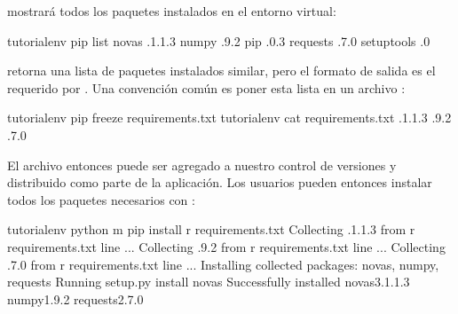 \documentclass[a4,10pt,spanish]{sphinxmanual}
\begin{document}
\sphinxAtStartPar
{} mostrará todos los paquetes instalados en el entorno virtual:

\begin{sphinxVerbatim}[commandchars=\\\{\}]
tutorial\PYGZhy{}env \PYGZdl{} pip list
novas .1.1.3
numpy .9.2
pip .0.3
requests .7.0
setuptools .0
\end{sphinxVerbatim}

\sphinxAtStartPar
{} retorna una lista de paquetes instalados similar, pero el formato de salida es el requerido por .  Una convención común es poner esta lista en un archivo :

\begin{sphinxVerbatim}[commandchars=\\\{\}]
tutorial\PYGZhy{}env \PYGZdl{} pip freeze \PYGZgt{} requirements.txt
tutorial\PYGZhy{}env \PYGZdl{} cat requirements.txt
.1.1.3
.9.2
.7.0
\end{sphinxVerbatim}

\sphinxAtStartPar
El archivo  entonces puede ser agregado a nuestro control de versiones y distribuido como parte de la aplicación. Los usuarios pueden entonces instalar todos los paquetes necesarios con :

\begin{sphinxVerbatim}[commandchars=\\\{\}]
tutorial\PYGZhy{}env \PYGZdl{} python \PYGZhy{}m pip install \PYGZhy{}r requirements.txt
Collecting .1.1.3 from \PYGZhy{}r requirements.txt line 
  ...
Collecting .9.2 from \PYGZhy{}r requirements.txt line 
  ...
Collecting .7.0 from \PYGZhy{}r requirements.txt line 
  ...
Installing collected packages: novas, numpy, requests
  Running setup.py install  novas
Successfully installed novas\PYGZhy{}3.1.1.3 numpy\PYGZhy{}1.9.2 requests\PYGZhy{}2.7.0
\end{sphinxVerbatim}
\end{document}
